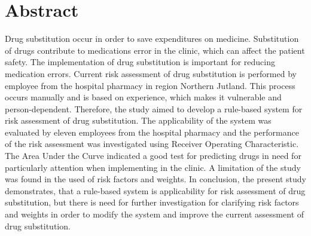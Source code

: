 \chapter*{Abstract}
Drug substitution occur in order to save expenditures on medicine. Substitution of drugs contribute to medications error in the clinic, which can affect the patient safety. The implementation of drug substitution is important for reducing medication errors. Current risk assessment of drug substitution is performed by employee from the hospital pharmacy in region Northern Jutland. This process occurs manually and is based on experience, which makes it vulnerable and person-dependent. Therefore, the study aimed to develop a rule-based system for risk assessment of drug substitution. The applicability of the system was evaluated by eleven employees from the hospital pharmacy and the performance of the risk assessment was investigated using Receiver Operating Characteristic. The Area Under the Curve indicated a good test for predicting drugs in need for particularly attention when implementing in the clinic. A limitation of the study was found in the used of risk factors and weights. In conclusion, the present study demonstrates, that a rule-based system is applicability for risk assessment of drug substitution, but there is need for further investigation for clarifying risk factors and weights in order to modify the system and improve the current assessment of drug substitution.  
